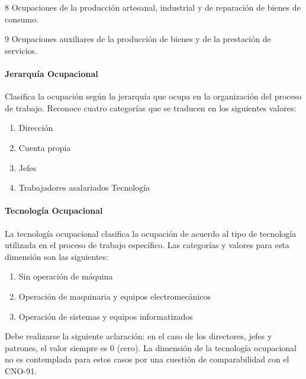 \documentclass[
]{book}
\providecommand{\tightlist}{%
  \setlength{\itemsep}{0pt}\setlength{\parskip}{0pt}}
\begin{document}
8 Ocupaciones de la producción artesanal, industrial y de reparación de bienes de consumo.

9 Ocupaciones auxiliares de la producción de bienes y de la prestación de servicios.

\hypertarget{jerarquuxeda-ocupacional}{%
\paragraph{Jerarquía Ocupacional}\label{jerarquuxeda-ocupacional}}

Clasifica la ocupación según la jerarquía que ocupa en la organización del proceso de trabajo. Reconoce cuatro categorías que se traducen en los siguientes valores:

\begin{enumerate}
\def\labelenumi{\arabic{enumi}.}
\setcounter{enumi}{-1}
\tightlist
\item
  Dirección\\
\item
  Cuenta propia\\
\item
  Jefes\\
\item
  Trabajadores asalariados Tecnología
\end{enumerate}

\hypertarget{tecnologuxeda-ocupacional}{%
\paragraph{Tecnología Ocupacional}\label{tecnologuxeda-ocupacional}}

La tecnología ocupacional clasifica la ocupación de acuerdo al tipo de tecnología utilizada en el proceso de trabajo específico. Las categorías y valores para esta dimensión son las siguientes:

\begin{enumerate}
\def\labelenumi{\arabic{enumi}.}
\tightlist
\item
  Sin operación de máquina\\
\item
  Operación de maquinaria y equipos electromecánicos\\
\item
  Operación de sistemas y equipos informatizados
\end{enumerate}

Debe realizarse la siguiente aclaración: en el caso de los directores, jefes y patrones, el valor siempre es 0 (cero). La dimensión de la tecnología ocupacional no es contemplada para estos casos por una cuestión de comparabilidad con el CNO-91.
\end{document}
